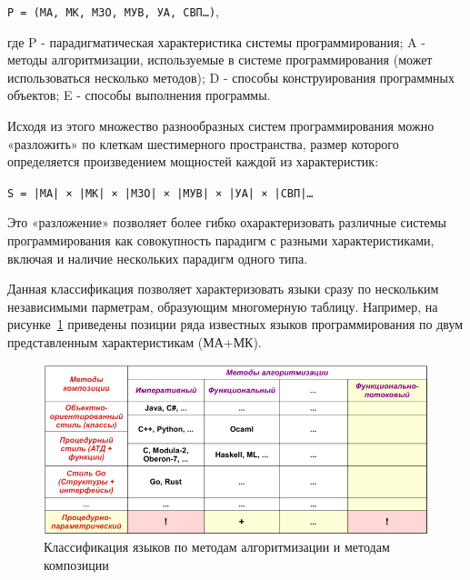 \begin{center}
    \verb|P = (МА, МК, МЗО, МУВ, УА, СВП…)|,\\
\end{center}
где P - парадигматическая характеристика системы программирования; A - методы алгоритмизации, используемые в системе программирования (может использоваться несколько методов); D - способы конструирования программных объектов; E - способы выполнения программы.

Исходя из этого множество разнообразных систем программирования можно «разложить» по клеткам шестимерного пространства, размер которого определяется произведением мощностей каждой из характеристик:

\begin{center}
    \verb!S = |МА| × |МК| × |МЗО| × |МУВ| × |УА| × |СВП|…!
\end{center}
Это «разложение» позволяет более гибко охарактеризовать различные системы программирования как совокупность парадигм с разными характеристиками, включая и наличие нескольких парадигм одного типа.

Данная классификация позволяет характеризовать языки сразу по нескольким независимыми парметрам, образующим многомерную таблицу. Например, на рисунке~\ref{f02-01} приведены позиции ряда известных языков программирования по двум представленным характеристикам (МА+МК).

\begin{figure}[htbp]
    \centering
    \includegraphics[width=1.0\textwidth]{img/f02-01.png}
    \caption{Классификация языков по методам алгоритмизации и методам композиции}
    \label{f02-01}
\end{figure}

